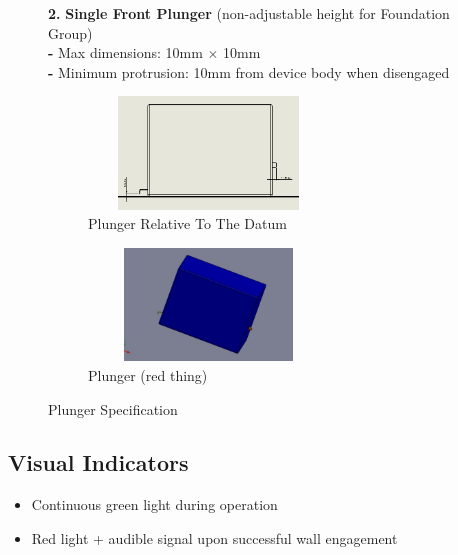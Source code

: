 \documentclass{article}
\newcommand{\wm}[2]{%
	\begin{minipage}{#1\textwidth}
		\centering
		#2
	\end{minipage}%
}
\begin{document}
\begin{itemize}[itemsep=-0.7mm]
	\begin{figure}[H]
	\begin{minipage}{0.4\textwidth}\vspace{-3em}
	\centering\wm{0.7}{\item[\textbf{2.}] \textbf{Single Front Plunger} (non-adjustable height for Foundation Group)\\\textbf{-} Max dimensions: 10mm $\times$ 10mm\\
	\textbf{-} Minimum protrusion: 10mm from device body when disengaged}
	\end{minipage}\hspace{-2em}
	\begin{minipage}{0.7\textwidth}			
		\centering
		\begin{subfigure}[t]{0.45\textwidth}
			\centering
			\includegraphics[width=0.7\textwidth,height=3cm]{extracted_images/image_11_2.png}
			\caption{Plunger Relative To The Datum}
			\label{fig:plungerall}
		\end{subfigure}\hspace{-1em}
		\begin{subfigure}[t]{0.5\textwidth}
			\centering
			\includegraphics[width=0.7\textwidth,height=3cm]{extracted_images/image_11_1.png}
			\caption{Plunger (red thing)}
			\label{fig:plunger}
		\end{subfigure}
		\caption{Plunger Specification}
	\end{minipage}
	\end{figure}
\end{itemize}
\vspace*{-2em}
\subsection{Visual Indicators}
\begin{itemize}[noitemsep,topsep=0pt]
	\item Continuous green light during operation
	\item Red light + audible signal upon successful wall engagement
\end{itemize}
\end{document}
